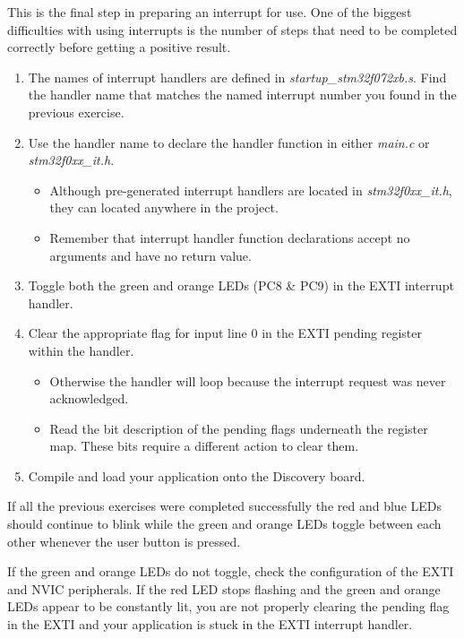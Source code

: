 \documentclass[11pt,fleqn]{book} %
\begin{document}
\begin{exercise}
    \label{ex5}
    This is the final step in preparing an interrupt for use. One of the biggest difficulties with using interrupts is the number of steps that need to be completed correctly before getting a positive result.
    
    \begin{enumerate}
        \item The names of interrupt handlers are defined in \textit{startup\_stm32f072xb.s}. Find the handler name that matches the named interrupt number you found in the previous exercise. 
        \item Use the handler name to declare the handler function in either \textit{main.c} or \textit{stm32f0xx\_it.h}.
        \begin{itemize}
            \item Although pre-generated interrupt handlers are located in \textit{stm32f0xx\_it.h}, they can located anywhere in the project. 
            \item Remember that interrupt handler function declarations accept no arguments and have no return value. 
        \end{itemize}
        \item Toggle both the green and orange LEDs (PC8 \& PC9) in the EXTI interrupt handler. 
        \item Clear the appropriate flag for input line 0 in the EXTI pending register within the handler.
        \begin{itemize}
            \item Otherwise the handler will loop because the interrupt request was never acknowledged.
            \item Read the bit description of the pending flags underneath the register map. These bits require a different action to clear them.
        \end{itemize}
        \item Compile and load your application onto the Discovery board.
    \end{enumerate}
    
    \noindent If all the previous exercises were completed successfully the red and blue LEDs should continue to blink while the green and orange LEDs toggle between each other whenever the user button is pressed. 
    
    If the green and orange LEDs do not toggle, check the configuration of the EXTI and NVIC peripherals. If the red LED stops flashing and the green and orange LEDs appear to be constantly lit, you are not properly clearing the pending flag in the EXTI and your application is stuck in the EXTI interrupt handler.
    
\end{exercise}
\end{document}
